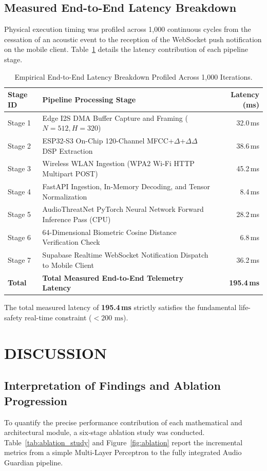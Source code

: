 \documentclass[12pt, a4paper]{report}
\begin{document}
\section{Measured End-to-End Latency Breakdown}
Physical execution timing was profiled across 1,000 continuous cycles from the cessation of an acoustic event to the reception of the WebSocket push notification on the mobile client. Table~\ref{tab:latency_breakdown} details the latency contribution of each pipeline stage.

\begin{table}[htbp]
\centering
\caption{Empirical End-to-End Latency Breakdown Profiled Across 1,000 Iterations.}
\label{tab:latency_breakdown}
\begin{tabular}{llr}
\toprule
\textbf{Stage ID} & \textbf{Pipeline Processing Stage} & \textbf{Latency (ms)} \\
\midrule
Stage 1 & Edge I2S DMA Buffer Capture and Framing ($N=512, H=320$) & 32.0\,ms \\
Stage 2 & ESP32-S3 On-Chip 120-Channel MFCC+$\Delta$+$\Delta\Delta$ DSP Extraction & 38.6\,ms \\
Stage 3 & Wireless WLAN Ingestion (WPA2 Wi-Fi HTTP Multipart POST) & 45.2\,ms \\
Stage 4 & FastAPI Ingestion, In-Memory Decoding, and Tensor Normalization & 8.4\,ms \\
Stage 5 & AudioThreatNet PyTorch Neural Network Forward Inference Pass (CPU) & 28.2\,ms \\
Stage 6 & 64-Dimensional Biometric Cosine Distance Verification Check & 6.8\,ms \\
Stage 7 & Supabase Realtime WebSocket Notification Dispatch to Mobile Client & 36.2\,ms \\
\midrule
\textbf{Total} & \textbf{Total Measured End-to-End Telemetry Latency} & \textbf{195.4\,ms} \\
\bottomrule
\end{tabular}
\end{table}

The total measured latency of \textbf{195.4\,ms} strictly satisfies the fundamental life-safety real-time constraint ($< 200\text{ ms}$).

\chapter{DISCUSSION}

\section{Interpretation of Findings and Ablation Progression}
To quantify the precise performance contribution of each mathematical and architectural module, a six-stage ablation study was conducted. Table~\ref{tab:ablation_study} and Figure~\ref{fig:ablation} report the incremental metrics from a simple Multi-Layer Perceptron to the fully integrated Audio Guardian pipeline.
\end{document}
